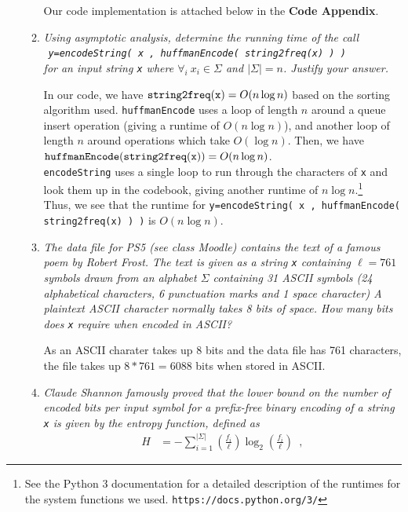 \documentclass[12pt]{article}
\begin{document}
\begin{enumerate}
\begin{enumerate}
	Our code implementation is attached below in the \textbf{Code Appendix}.
		
	\item \textit{Using asymptotic analysis, determine the running time of the call \\ ${}^{}$\hspace{10mm} {\tt y=encodeString( x , huffmanEncode( string2freq(x) ) )} \\ for an input string {\tt x} where $\forall_{i}~x_{i}\in 
\Sigma$ and $|\Sigma|=n$. Justify your answer.}
	
    In our code, we have ${\tt string2freq(x)} = O(n\log n)$ based on the sorting algorithm used. {\tt huffmanEncode} uses a loop of length $n$ around a queue insert operation (giving a runtime of $O(n\log n)$), and another loop of 
length $n$ around operations which take $O(\log n)$. Then, we have ${\tt huffmanEncode( string2freq(x) )} = O(n\log n)$.\\
    
    {\tt encodeString} uses a single loop to run through the characters of {\tt x} and look them up in the codebook, giving another runtime of $n\log n$.\footnote{See the Python 3 documentation for a detailed description of the 
runtimes for the system functions we used. {\tt https://docs.python.org/3/}}\\
    
    Thus, we see that the runtime for {\tt y=encodeString( x , huffmanEncode( string2freq(x) ) )} is $O(n\log n)$.\\
	
	\item \textit{The data file for PS5 (see class Moodle) contains the text of a famous poem by Robert Frost. The text is given as a string {\tt x} containing $\ell=761$ symbols drawn from an alphabet $\Sigma$ containing 31 
ASCII symbols (24 alphabetical characters, 6 punctuation marks and 1 space character)
	A plaintext ASCII character normally takes 8 bits of space. How many bits does {\tt x} require when encoded in ASCII?}
	
	As an ASCII charater takes up 8 bits and the data file has 761 characters, the file takes up $8*761 = \boxed{6088}$ bits when stored in ASCII.
	
	
	\item \textit{\label{q:1:entropy}Claude Shannon famously proved that the lower bound on the number of encoded bits per input symbol for a prefix-free binary encoding of a string {\tt x} is given by the {\em entropy} 
function, defined as}
	\begin{align}
	H & = -\sum_{i=1}^{|\Sigma|} \left(\frac{f_{i}}{\ell}\right) \log_{2} \left(\frac{f_{i}}{\ell}\right) \label{q:H} \enspace ,
	\end{align}
	

\end{enumerate}
\end{enumerate}
\end{document}
